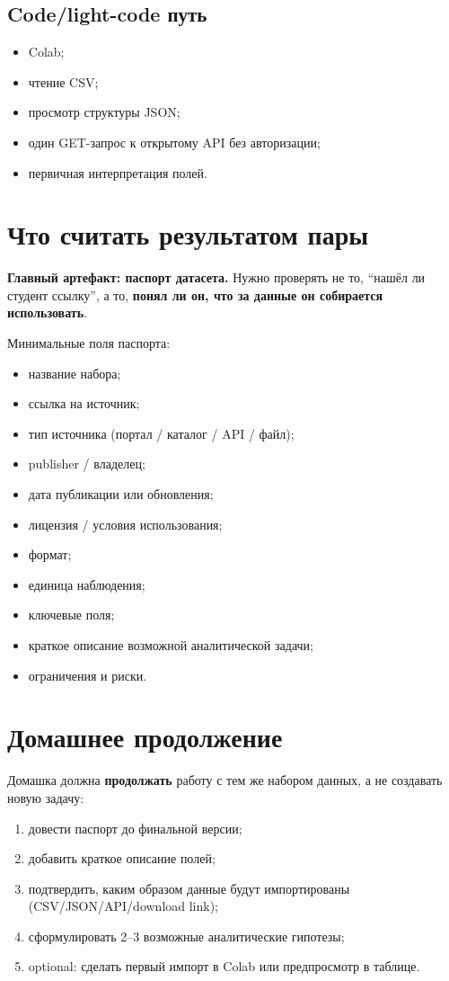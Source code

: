 \documentclass[11pt,a4paper]{article}
\begin{document}
\subsection{Code/light-code путь}
\begin{itemize}[leftmargin=1.2em]
\item Colab;
\item чтение CSV;
\item просмотр структуры JSON;
\item один GET-запрос к открытому API без авторизации;
\item первичная интерпретация полей.
\end{itemize}

\section{Что считать результатом пары}

\noindent\colorbox{Warn}{\parbox{\dimexpr\linewidth-2\fboxsep}{
\textbf{Главный артефакт: паспорт датасета.}
Нужно проверять не то, ``нашёл ли студент ссылку'', а то, \textbf{понял ли он, что за данные он собирается использовать}.
}}

\vspace{0.5em}

Минимальные поля паспорта:
\begin{itemize}[leftmargin=1.2em]
\item название набора;
\item ссылка на источник;
\item тип источника (портал / каталог / API / файл);
\item publisher / владелец;
\item дата публикации или обновления;
\item лицензия / условия использования;
\item формат;
\item единица наблюдения;
\item ключевые поля;
\item краткое описание возможной аналитической задачи;
\item ограничения и риски.
\end{itemize}

\section{Домашнее продолжение}

Домашка должна \textbf{продолжать} работу с тем же набором данных, а не создавать новую задачу:
\begin{enumerate}[leftmargin=1.3em]
\item довести паспорт до финальной версии;
\item добавить краткое описание полей;
\item подтвердить, каким образом данные будут импортированы (CSV/JSON/API/download link);
\item сформулировать 2--3 возможные аналитические гипотезы;
\item optional: сделать первый импорт в Colab или предпросмотр в таблице.
\end{enumerate}
\end{document}

